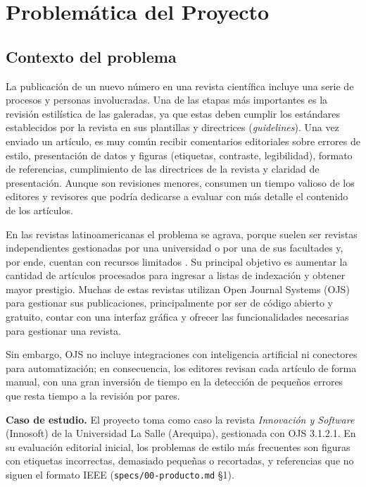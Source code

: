 
\chapter{Problemática del Proyecto}\label{cap:problematica}

\section{Contexto del problema}

La publicación de un nuevo número en una revista científica incluye una serie de procesos y personas involucradas. Una de las etapas más importantes es la revisión estilística de las galeradas, ya que estas deben cumplir los estándares establecidos por la revista en sus plantillas y directrices (\emph{guidelines}). Una vez enviado un artículo, es muy común recibir comentarios editoriales sobre errores de estilo, presentación de datos y figuras (etiquetas, contraste, legibilidad), formato de referencias, cumplimiento de las directrices de la revista y claridad de presentación. Aunque son revisiones menores, consumen un tiempo valioso de los editores y revisores que podría dedicarse a evaluar con más detalle el contenido de los artículos.

En las revistas latinoamericanas el problema se agrava, porque suelen ser revistas independientes gestionadas por una universidad o por una de sus facultades y, por ende, cuentan con recursos limitados \cite{ref1}. Su principal objetivo es aumentar la cantidad de artículos procesados para ingresar a listas de indexación y obtener mayor prestigio. Muchas de estas revistas utilizan Open Journal Systems (OJS) \cite{ref2} para gestionar sus publicaciones, principalmente por ser de código abierto y gratuito, contar con una interfaz gráfica y ofrecer las funcionalidades necesarias para gestionar una revista.

Sin embargo, OJS no incluye integraciones con inteligencia artificial ni conectores para automatización; en consecuencia, los editores revisan cada artículo de forma manual, con una gran inversión de tiempo en la detección de pequeños errores que resta tiempo a la revisión por pares.

\textbf{Caso de estudio.} El proyecto toma como caso la revista \emph{Innovación y Software} (Innosoft) de la Universidad La Salle (Arequipa), gestionada con OJS 3.1.2.1. En su evaluación editorial inicial, los problemas de estilo más frecuentes son figuras con etiquetas incorrectas, demasiado pequeñas o recortadas, y referencias que no siguen el formato IEEE (\texttt{specs/\allowbreak{}00-producto.\allowbreak{}md} §1).

